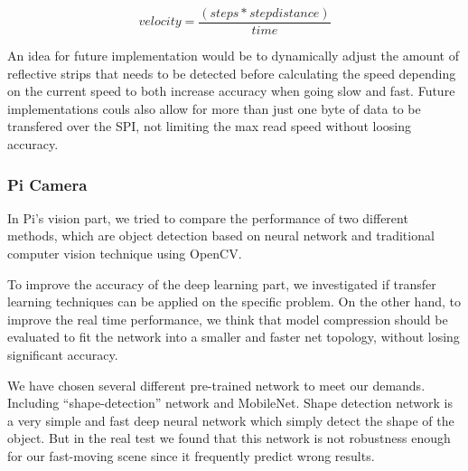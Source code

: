 \documentclass[11pt, titlepage]{article} %
\begin{document}
\begin{equation}
    velocity = \frac{(steps*stepdistance)}{time}
    \label{eq:velocity}
\end{equation}

An idea for future implementation would be to dynamically adjust the amount of reflective strips that needs to be detected before calculating the speed depending on the current speed to both increase accuracy when going slow and fast. Future implementations couls also allow for more than just one byte of data to be transfered over the SPI, not limiting the max read speed without loosing accuracy.

\subsubsection{Pi Camera}
In Pi’s vision part, we tried to compare the performance of two different methods, which are object detection based on neural network and traditional computer vision technique using OpenCV.

To improve the accuracy of the deep learning part, we investigated if transfer learning techniques can be applied on the specific problem. On the other hand, to improve the real time performance, we think that model compression should be evaluated to fit the network into a smaller and faster net topology, without losing significant accuracy. 

We have chosen several different pre-trained network to meet our demands. Including “shape-detection” network and MobileNet. Shape detection network is a very simple and fast deep neural network which simply detect the shape of the object. But in the real test we found that this network is not robustness enough for our fast-moving scene since it frequently predict wrong results.
\end{document}
